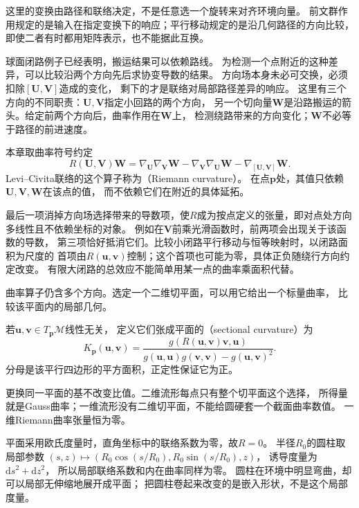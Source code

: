 这里的变换由路径和联络决定，不是任意选一个旋转来对齐环境向量。
前文群作用规定的是输入在指定变换下的响应；平行移动规定的是沿几何路径的方向比较，
即使二者有时都用矩阵表示，也不能据此互换。


球面闭路例子已经表明，搬运结果可以依赖路线。
为检测一个点附近的这种差异，可以比较沿两个方向先后求协变导数的结果。
方向场本身未必可交换，必须扣除$[\bm U,\bm V]$造成的变化，
剩下的才是联络对局部路径差异的响应。
这里有三个方向的不同职责：$\bm U,\bm V$指定小回路的两个方向，
另一个切向量$\bm W$是沿路搬运的箭头。给定前两个方向后，曲率作用在$\bm W$上，
检测绕路带来的方向变化；$\bm W$不必等于路径的前进速度。

\begin{definition}[Riemann曲率]
\label{def:geometry-riemann-curvature}
本章取曲率符号约定
\begin{equation}
 R(\bm U,\bm V)\bm W
 =\nabla_{\bm U}\nabla_{\bm V}\bm W
  -\nabla_{\bm V}\nabla_{\bm U}\bm W
  -\nabla_{[\bm U,\bm V]}\bm W.
 \label{eq:geometry-riemann-curvature}
\end{equation}
Levi--Civita联络的这个算子称为（Riemann curvature）。
在点$\bm p$处，其值只依赖$\bm U,\bm V,\bm W$在该点的值，
而不依赖它们在附近的具体延拓。
\end{definition}
最后一项消掉方向场选择带来的导数项，使$R$成为按点定义的张量，即对点处方向多线性且不依赖坐标的对象。
例如在$\bm V$前乘光滑函数时，前两项会出现关于该函数的导数，
第三项恰好抵消它们。比较小闭路平行移动与恒等映射时，以闭路面积为尺度的
首项由$R(\bm u,\bm v)$控制；这个首项也可能为零，具体正负随绕行方向约定改变。
有限大闭路的总效应不能简单用某一点的曲率乘面积代替。

曲率算子仍含多个方向。选定一个二维切平面，可以用它给出一个标量曲率，
比较该平面内的局部几何。
\begin{definition}[截面曲率]
\label{def:geometry-sectional-curvature}
若$\bm u,\bm v\in T_{\bm p}\mathcal M$线性无关，
定义它们张成平面的（sectional curvature）为
\begin{equation}
 K_{\bm p}(\bm u,\bm v)
 =\frac{g(R(\bm u,\bm v)\bm v,\bm u)}
 {g(\bm u,\bm u)g(\bm v,\bm v)-g(\bm u,\bm v)^2}.
 \label{eq:geometry-sectional-curvature}
\end{equation}
分母是该平行四边形的平方面积，正定性保证它为正。
\end{definition}
更换同一平面的基不改变比值。二维流形每点只有整个切平面这个选择，
所得量就是Gauss曲率；一维流形没有二维切平面，不能给圆硬套一个截面曲率数值。
一维Riemann曲率张量恒为零。

平面采用欧氏度量时，直角坐标中的联络系数为零，故$R=0$。
半径$R_0$的圆柱取局部参数
$(s,z)\mapsto(R_0\cos(s/R_0),R_0\sin(s/R_0),z)$，
诱导度量为$\mathrm ds^2+\mathrm dz^2$，
所以局部联络系数和内在曲率同样为零。
圆柱在环境中明显弯曲，却可以局部无伸缩地展开成平面；
把圆柱卷起来改变的是嵌入形状，不是这个局部度量。

